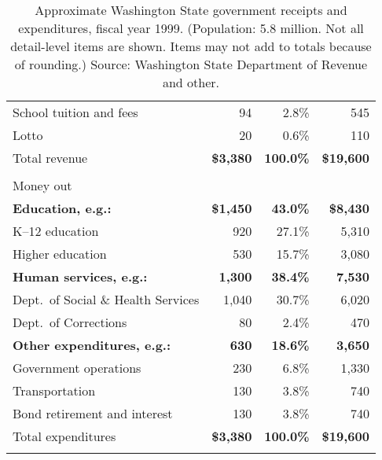 \begin{table}[p]
\begin{center}
\begin{tabular}{lrrr}
\hspace{.4cm} School tuition and fees & 94 & 2.8\% & 545 \\ %
\hspace{.4cm} Lotto & 20 & 0.6\% & 110 \\ %
\sc Total revenue & \bf \$3,380 & \bf 100.0\% & \bf \$19,600 \\%
& & & \\ %
\sc Money out & & & \\ %
\hspace{.1cm} \bf\small Education\rm, e.g.: & \bf\small \$1,450 & \bf\small 43.0\% & \bf\small \$8,430 \\ %
\hspace{.4cm} K--12 education & 920 & 27.1\% & 5,310 \\
\hspace{.4cm} Higher education  & 530 & 15.7\% & 3,080 \\
\hspace{.1cm} \bf\small Human services\rm, e.g.: & \bf\small 1,300 & \bf\small 38.4\% & \bf\small 7,530 \\ %
\hspace{.4cm} Dept.\ of Social \& Health Services & 1,040 & 30.7\% & 6,020 \\ %
\hspace{.4cm} Dept.\ of Corrections & 80 & 2.4\% & 470 \\ %
\hspace{.1cm} \bf\small Other expenditures\rm, e.g.: & \bf\small 630 & \bf\small 18.6\% & \bf\small 3,650 \\ %
\hspace{.4cm} Government operations & 230 & 6.8\% & 1,330 \\
\hspace{.4cm} Transportation & 130 & 3.8\% & 740 \\
\hspace{.4cm} Bond retirement and interest & 130 & 3.8\% & 740 \\
\sc Total expenditures & \bf \$3,380 & \bf 100.0\% & \bf \$19,600 \\
& & & \\ %
\end{tabular}
\caption{Approximate Washington State government receipts and expenditures, fiscal year 1999. (Population: 5.8 million. Not all detail-level items are shown. Items may not add to totals because of rounding.) Source: Washington State Department of Revenue and other.}
\label{wabudget}
\end{center}
\end{table}
